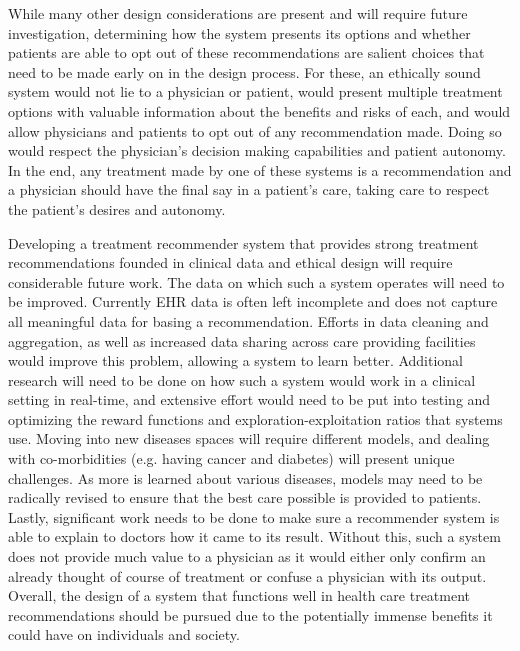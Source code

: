\documentclass[]{spie}  %
\begin{document}
While many other design considerations are present and will require future investigation, determining how the system presents its options and whether patients are able to opt out of these recommendations are salient choices that need to be made early on in the design process. For these, an ethically sound system would not lie to a physician or patient, would present multiple treatment options with valuable information about the benefits and risks of each, and would allow physicians and patients to opt out of any recommendation made. Doing so would respect the physician’s decision making capabilities and patient autonomy. In the end, any treatment made by one of these systems is a recommendation and a physician should have the final say in a patient’s care, taking care to respect the patient’s desires and autonomy.

Developing a treatment recommender system that provides strong treatment recommendations founded in clinical data and ethical design will require considerable future work. The data on which such a system operates will need to be improved. Currently EHR data is often left incomplete and does not capture all meaningful data for basing a recommendation. Efforts in data cleaning and aggregation, as well as increased data sharing across care providing facilities would improve this problem, allowing a system to learn better. Additional research will need to be done on how such a system would work in a clinical setting in real-time, and extensive effort would need to be put into testing and optimizing the reward functions and exploration-exploitation ratios that systems use. Moving into new diseases spaces will require different models, and dealing with co-morbidities (e.g. having cancer and diabetes) will present unique challenges. As more is learned about various diseases, models may need to be radically revised to ensure that the best care possible is provided to patients. Lastly, significant work needs to be done to make sure a recommender system is able to explain to doctors how it came to its result. Without this, such a system does not provide much value to a physician as it would either only confirm an already thought of course of treatment or confuse a physician with its output. Overall, the design of a system that functions well in health care treatment recommendations should be pursued due to the potentially immense benefits it could have on individuals and society.

\appendix

\end{document}
